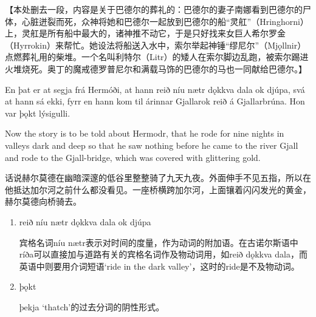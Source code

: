 【本处删去一段，内容是关于巴德尔的葬礼的：巴德尔的妻子南娜看到巴德尔的尸体，心脏迸裂而死，众神将她和巴德尔一起放到巴德尔的船“灵舡”（Hringhorni）上，灵舡是所有船中最大的，诸神推不动它，于是只好找来女巨人希尔罗金（Hyrrokin）来帮忙。她设法将船送入水中，索尔举起神锤“缪尼尔”（Mjǫllnir）点燃葬礼用的柴堆。一个名叫利特尔（Litr）的矮人在索尔脚边乱跑，被索尔踢进火堆烧死。奥丁的魔戒德罗普尼尔和满载马饰的巴德尔的马也一同献给巴德尔。】
\hspace*{\fill}\\
\begin{paracol}{2}
    En þat er at segja frá Hermóði, at hann reið níu nætr dǫkkva dala ok djúpa, svá at hann sá ekki, fyrr en hann kom til árinnar Gjallar\footnotemark[1] ok reið á Gjallarbrúna. Hon var þǫkt lýsigulli.

    \switchcolumn

    Now the story is to be told about Hermodr, that he rode for nine nights in valleys dark and deep so that he saw nothing before he came to the river Gjall and rode to the Gjall-bridge, which was covered with glittering gold.
\end{paracol}
\begin{translation*}{}
    话说赫尔莫德在幽暗深邃的低谷里整整骑了九天九夜。外面伸手不见五指，所以在他抵达加尔河之前什么都没看见。一座桥横跨加尔河，上面镶着闪闪发光的黄金，赫尔莫德向桥骑去。
\end{translation*}
\begin{grammar*}{}
    \begin{enumerate}[leftmargin=*]
        \item reið níu nætr dǫkkva dala ok djúpa

              宾格名词níu nætr表示对时间的度量，作为动词的附加语。在古诺尔斯语中ríða可以直接加与道路有关的宾格名词作及物动词用，如reið dǫkkva dala，而英语中则要用介词短语`ride in the dark valley'，这时的ride是不及物动词。

        \item þǫkt

              þekja `thatch'的过去分词的阴性形式。
    \end{enumerate}
\end{grammar*}
